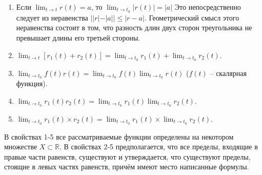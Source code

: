 \begin{enumerate}
    \item Если $\lim_{t\to{t}}r(t)=a$, то $\lim_{t\to{t_0}}\vert{r(t)}\vert=\vert{a}\vert$
    Это непосредственно следует из неравенства $\vert\vert{r}\vert-\vert{a}\vert\vert\leq\vert{r-a}\vert$.
    Геометрический смысл этого неравенства состоит в том, что разность длин двух сторон треугольника 
    не превышает длины его третьей стороны.
    \item $\lim_{t\to{t}}[r_1(t)+r_2(t)]=\lim_{t\to{t_0}}r_1(t)+\lim_{t\to{t_0}}r_2(t)$.
    \item $\lim_{t\to{t_0}}f(t)r(t)=\lim_{t\to{t_0}}f(t)\lim_{t\to{t_0}}r(t)$ ($f(t)$ -- скалярная функция).
    \item $\lim_{t\to{t_0}}r_1(t)r_2(t)=\lim_{t\to{t_0}}r_1(t)\lim_{t\to{t_0}}r_2(t)$.
    \item $\lim_{t\to{t_0}}r_1(t)\times{r_2(t)}=\lim_{t\to{t_0}}r_1(t)\times\lim_{t\to{t_0}}r_2(t)$.
\end{enumerate}
В свойствах 1-5 все рассматриваемые функции определены на некотором множестве $X\subset\mathbb{R}$. 
В свойствах 2-5 предполагается, что все пределы, входящие в правые части равенств, существуют и утверждается,
что существуют пределы, стоящие в левых частях равенств, причём имеют место написанные формулы.